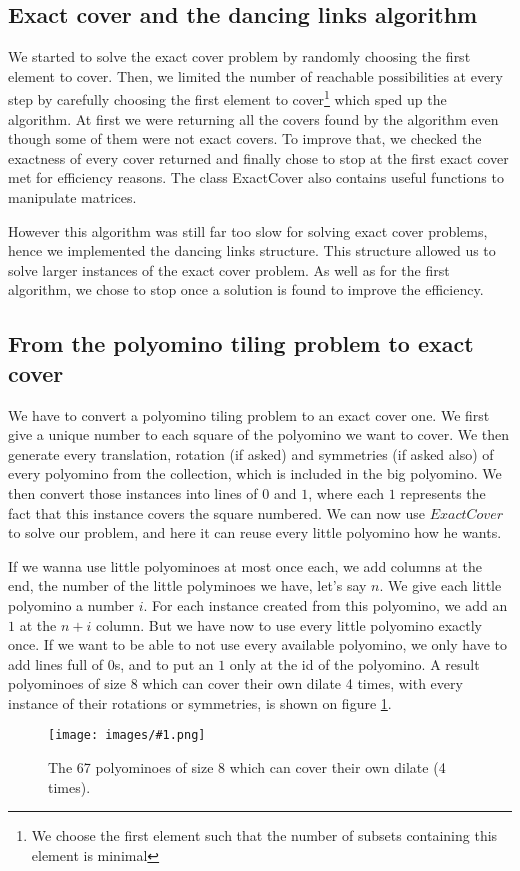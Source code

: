 \documentclass[12pt]{article}
\newcommand{\illustration}[2]{
	\begin{figure}[]
	\begin{center}
	\texttt{[image: images/\#1.png]}
	\caption{#2}
	\label{fig:#1}
	\end{center}
	\end{figure}
}
\begin{document}
\subsection{Exact cover and the dancing links algorithm}

We started to solve the exact cover problem by randomly choosing the first element to cover. Then, we limited the number of reachable possibilities at every step by carefully choosing the first element to cover\footnote{We choose the first element such that the number of subsets containing this element is minimal} which sped up the algorithm. At first we were returning all the covers found by the algorithm even though some of them were not exact covers. To improve that, we checked the exactness of every cover returned and finally chose to stop at the first exact cover met for efficiency reasons. The class ExactCover also contains useful functions to manipulate matrices. 

However this algorithm was still far too slow for solving exact cover problems, hence we implemented the dancing links structure. This structure allowed us to solve larger instances of the exact cover problem. As well as for the first algorithm, we chose to stop once a solution is found to improve the efficiency.



\subsection{From the polyomino tiling problem to exact cover}

We have to convert a polyomino tiling problem to an exact cover one.
We first give a unique number to each square of the polyomino we want to cover.
We then generate every translation, rotation (if asked) and symmetries (if asked also) of every polyomino from the collection, which is included in the big polyomino.
We then convert those instances into lines of $0$ and $1$, where each $1$ represents the fact that this instance covers the square numbered.
We can now use $ExactCover$ to solve our problem, and here it can reuse every little polyomino how he wants.

If we wanna use little polyominoes at most once each, we add columns at the end, the number of the little polyminoes we have, let's say $n$.
We give each little polyomino a number $i$.
For each instance created from this polyomino, we add an $1$ at the $n + i$ column.
But we have now to use every little polyomino exactly once.
If we want to be able to not use every available polyomino, we only have to add lines full of $0$s, and to put an $1$ only at the id of the polyomino.
A result polyominoes of size 8 which can cover their own dilate 4 times, with every instance of their rotations or symmetries, is shown on figure \ref{fig:dilatation}.


\illustration{dilatation}{The 67 polyominoes of size 8 which can cover their own dilate (4 times).}
\end{document}
